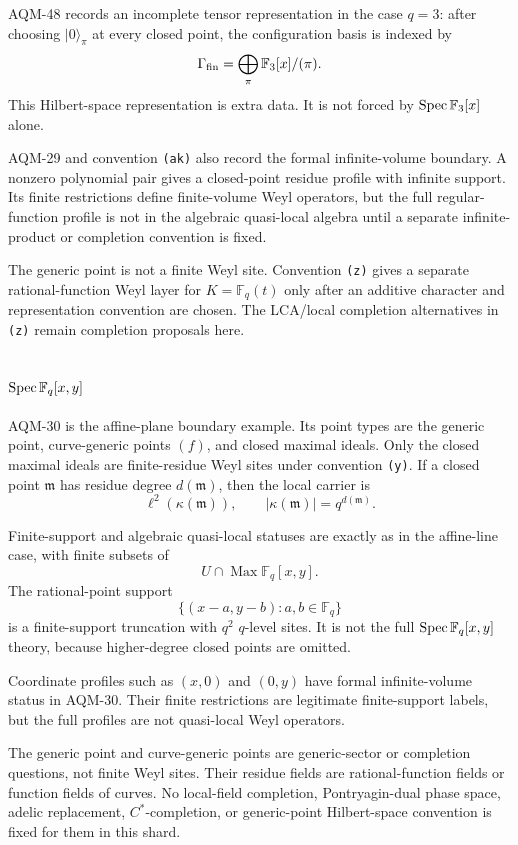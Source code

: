 AQM-48 records an incomplete tensor representation in the case
\(q=3\): after choosing \(|0\rangle_\pi\) at every closed point, the
configuration basis is indexed by
\[
  \Gamma_{\rm fin}=\bigoplus_\pi \mathbb F_3[x]/(\pi).
\]
This Hilbert-space representation is extra data.  It is not forced by
\(\operatorname{Spec}\mathbb F_3[x]\) alone.

AQM-29 and convention \texttt{(ak)} also record the formal infinite-volume
boundary.  A nonzero polynomial pair gives a closed-point residue profile
with infinite support.  Its finite restrictions define finite-volume Weyl
operators, but the full regular-function profile is not in the algebraic
quasi-local algebra until a separate infinite-product or completion convention
is fixed.

The generic point is not a finite Weyl site.  Convention \texttt{(z)} gives a
separate rational-function Weyl layer for \(K=\mathbb F_q(t)\) only after an
additive character and representation convention are chosen.  The LCA/local
completion alternatives in \texttt{(z)} remain completion proposals here.

\subsection{\texorpdfstring{\(\operatorname{Spec}\mathbb F_q[x,y]\)}{Spec Fq[x,y]}}

AQM-30 is the affine-plane boundary example.  Its point types are the generic
point, curve-generic points \((f)\), and closed maximal ideals.  Only the
closed maximal ideals are finite-residue Weyl sites under convention
\texttt{(y)}.  If a closed point \(\mathfrak m\) has residue degree
\(d(\mathfrak m)\), then the local carrier is
\[
  \ell^2(\kappa(\mathfrak m)),
  \qquad |\kappa(\mathfrak m)|=q^{d(\mathfrak m)}.
\]

Finite-support and algebraic quasi-local statuses are exactly as in the
affine-line case, with finite subsets of
\[
  U\cap\operatorname{Max}\mathbb F_q[x,y].
\]
The rational-point support
\[
  \{(x-a,y-b):a,b\in\mathbb F_q\}
\]
is a finite-support truncation with \(q^2\) \(q\)-level sites.  It is not the
full \(\operatorname{Spec}\mathbb F_q[x,y]\) theory, because higher-degree closed points are
omitted.

Coordinate profiles such as \((x,0)\) and \((0,y)\) have formal
infinite-volume status in AQM-30.  Their finite restrictions are legitimate
finite-support labels, but the full profiles are not quasi-local Weyl
operators.

The generic point and curve-generic points are generic-sector or completion
questions, not finite Weyl sites.  Their residue fields are rational-function
fields or function fields of curves.  No local-field completion,
Pontryagin-dual phase space, adelic replacement, \(C^*\)-completion, or
generic-point Hilbert-space convention is fixed for them in this shard.

